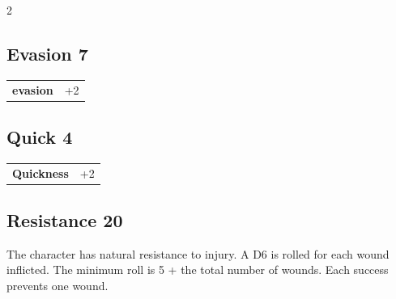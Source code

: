 \begin{multicols}{2}
\begin{tcolorbox}
\vspace{3mm}



\end{tcolorbox}

\begin{tcolorbox}
    \subsection*{Evasion \hfill \small{7 }}
    \tcblower




\begin{tabular}{@{}ll@{}}
    \textbf{evasion} & +2\\
\end{tabular}


\end{tcolorbox}

\begin{tcolorbox}
    \subsection*{Quick \hfill \small{4 }}
    \tcblower




\begin{tabular}{@{}ll@{}}
    \textbf{Quickness} & +2\\
\end{tabular}


\end{tcolorbox}

\begin{tcolorbox}
    \subsection*{Resistance \hfill \small{20 }}
    \tcblower
The character has natural resistance to injury. A D6 is rolled for each wound inflicted. The minimum roll is 5 + the total number of wounds. Each success prevents one wound.



\end{tcolorbox}
\end{multicols}
